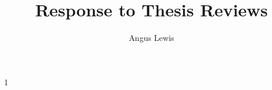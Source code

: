 \documentclass[a4paper]{article}
\title{Response to Thesis Reviews}
\author{Angus Lewis}
\begin{document}
 1
\end{document}

